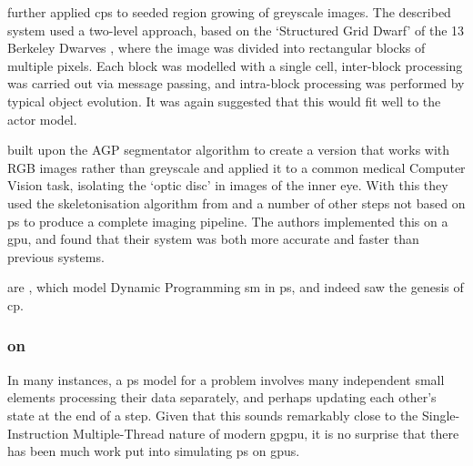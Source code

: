 \citeauthor{Nicolescu2015a} \cite{Nicolescu2015a} further applied \gls{cps} to seeded region growing of greyscale images.  The described system used a two-level approach, based on the `Structured Grid Dwarf' of the 13 Berkeley Dwarves \cite{Asanovic2006}, where the image was divided into rectangular blocks of multiple pixels.  Each block was modelled with a single cell, inter-block processing was carried out via message passing, and intra-block processing was performed by typical object evolution.  It was again suggested that this would fit well to the \Gls{actor} model.

\citeauthor{Diaz-Pernil2016} \cite{Diaz-Pernil2016} built upon the AGP segmentator algorithm to create a version that works with RGB images rather than greyscale and applied it to a common medical Computer Vision task, isolating the `optic disc' in images of the inner eye.  With this they used the skeletonisation algorithm from \cite{Diaz-Pernil2013a} and a number of other steps not based on \gls{ps} to produce a complete imaging pipeline.  The authors implemented this on a \gls{gpu}, and found that their system was both more accurate and faster than previous systems.

 are \cite{GimelFarb2013a,Gimelfarb2011,Nicolescu2014b}, which model Dynamic Programming \gls{sm} in \gls{ps}, and indeed saw the genesis of \gls{cp}.

\subsubsection{ on }
In many instances, a \gls{ps} model for a problem involves many independent small elements processing their data separately, and perhaps updating each other's state at the end of a step.  Given that this sounds remarkably close to the Single-Instruction Multiple-Thread \cite[Ch. 4.4.1]{Hennessy2012} nature of modern \gls{gpgpu}, it is no surprise that there has been much work put into simulating \gls{ps} on \glspl{gpu}.

